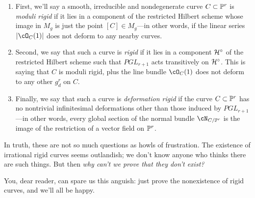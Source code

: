 \begin{enumerate} 
\item First, we'll say a smooth, irreducible and nondegenerate curve $C \subset \PP^r$ is \emph{moduli rigid} if it lies in a component of the restricted Hilbert scheme whose image in $M_g$ is just the point $[C] \in M_g$---in other words, if the linear series $|\cO_C(1)|$ does not deform to any nearby curves.

\item Second, we say that such a curve is \emph{rigid} if it lies in a component $\cH^\circ$ of the restricted Hilbert scheme such that $PGL_{r+1}$ acts transitively on $\cH^\circ$. This is saying that $C$ is moduli rigid, plus the line bundle $\cO_C(1)$ does not deform to any other $g^r_d$ on $C$.

\item Finally, we say that such a curve is \emph{deformation rigid} if the curve $C \subset \PP^r$ has no nontrivial infinitesimal deformations other than those induced by $PGL_{r+1}$---in other words, every global section of the normal bundle $\cN_{C/\PP^r}$ is the image of the restriction of a vector field on $\PP^r$.
\end{enumerate}

In truth, these are not so much questions as howls of frustration. The existence of irrational rigid curves seems outlandish; we don't know anyone who thinks there are such things. But then \emph{why can't we prove that they don't exist?} 

You, dear reader, can spare us this anguish: just prove the nonexistence of rigid curves, and we'll all be happy.

